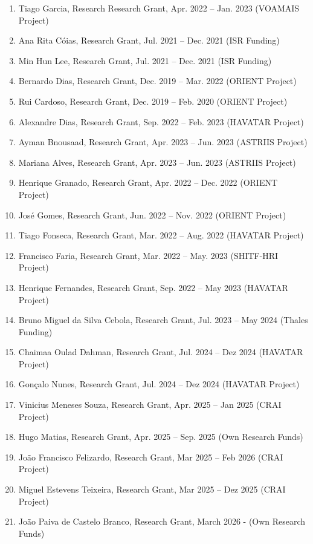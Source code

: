 \begin{enumerate}
  Tiago Mendes, Research Grant, Apr. 2022 -- Sep. 2022 (VOAMAIS Project)
\item
  Tiago Garcia, Research Research Grant, Apr. 2022 -- Jan. 2023 (VOAMAIS
  Project)
\item
  Ana Rita Cóias, Research Grant, Jul. 2021 -- Dec. 2021 (ISR Funding)
\item
  Min Hun Lee, Research Grant, Jul. 2021 -- Dec. 2021 (ISR Funding)
\item
  Bernardo Dias, Research Grant, Dec. 2019 -- Mar. 2022 (ORIENT Project)
\item
  Rui Cardoso, Research Grant, Dec. 2019 -- Feb. 2020 (ORIENT Project)
\item
  Alexandre Dias, Research Grant, Sep. 2022 -- Feb. 2023 (HAVATAR
  Project)
\item
  Ayman Bnousaad, Research Grant, Apr. 2023 -- Jun. 2023 (ASTRIIS
  Project)
\item
  Mariana Alves, Research Grant, Apr. 2023 -- Jun. 2023 (ASTRIIS
  Project)
\item
  Henrique Granado, Research Grant, Apr. 2022 -- Dec. 2022 (ORIENT
  Project)
\item
  José Gomes, Research Grant, Jun. 2022 -- Nov. 2022 (ORIENT Project)
\item
  Tiago Fonseca, Research Grant, Mar. 2022 -- Aug. 2022 (HAVATAR
  Project)
\item
  Francisco Faria, Research Grant, Mar. 2022 -- May. 2023 (SHITF-HRI
  Project)
\item
  Henrique Fernandes, Research Grant, Sep. 2022 -- May 2023 (HAVATAR
  Project)
\item
  Bruno Miguel da Silva Cebola, Research Grant, Jul. 2023 -- May 2024
  (Thales Funding)
\item
  Chaimaa Oulad Dahman, Research Grant, Jul. 2024 -- Dez 2024 (HAVATAR
  Project)
\item
  Gonçalo Nunes, Research Grant, Jul. 2024 -- Dez 2024 (HAVATAR Project)
\item
  Vinicius Meneses Souza, Research Grant, Apr. 2025 -- Jan 2025 (CRAI
  Project)
\item
  Hugo Matias, Research Grant, Apr. 2025 -- Sep. 2025 (Own Research
  Funds)
\item
  João Francisco Felizardo, Research Grant, Mar 2025 -- Feb 2026 (CRAI
  Project)
\item
  Miguel Estevens Teixeira, Research Grant, Mar 2025 -- Dez 2025 (CRAI
  Project)
\item
  João Paiva de Castelo Branco, Research Grant, March 2026 - (Own
  Research Funds)
\end{enumerate}

